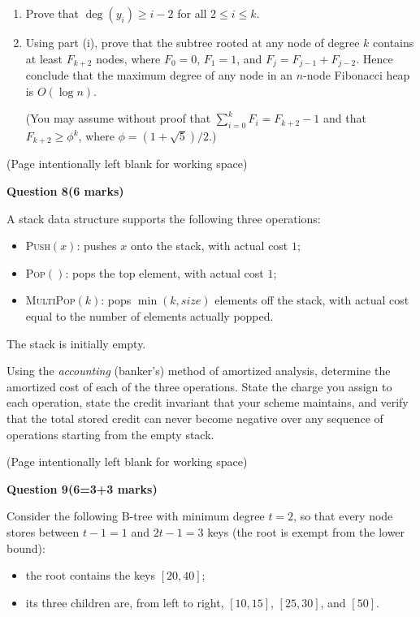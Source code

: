 \documentclass[12pt,letterpaper]{article}
\newcommand{\marksbox}[1]{%
  \vfill
  \begin{flushright}
    \fbox{\parbox[c][1.1cm][c]{1.3cm}{\centering #1}}
  \end{flushright}
}
\newcommand{\questiontitle}[2]{%
  \textbf{Question #1}\hfill\textbf{(#2 marks)}
}
\newcommand{\workingpage}{%
  \newpage
  \begin{center}
    (Page intentionally left blank for working space)
  \end{center}
}
\begin{document}
\begin{enumerate}
  \item[(i)] Prove that $\deg(y_i) \geq i - 2$ for all $2 \leq i \leq k$.

  \item[(ii)] Using part (i), prove that the subtree rooted at any node of
  degree $k$ contains at least $F_{k+2}$ nodes, where $F_0 = 0$, $F_1 = 1$,
  and $F_{j} = F_{j-1} + F_{j-2}$. Hence conclude that the maximum degree of
  any node in an $n$-node Fibonacci heap is $O(\log n)$.

  (You may assume without proof that
  $\sum_{i=0}^{k} F_i = F_{k+2} - 1$ and that $F_{k+2} \geq \phi^{k}$, where
  $\phi = (1 + \sqrt{5})/2$.)
\end{enumerate}

\marksbox{6}

\workingpage
\newpage

\questiontitle{8}{6}

A stack data structure supports the following three operations:

\begin{itemize}
  \item \textsc{Push}$(x)$: pushes $x$ onto the stack, with actual cost $1$;
  \item \textsc{Pop}$()$: pops the top element, with actual cost $1$;
  \item \textsc{MultiPop}$(k)$: pops $\min(k, \mathit{size})$ elements off the
  stack, with actual cost equal to the number of elements actually popped.
\end{itemize}

The stack is initially empty.

Using the \emph{accounting} (banker's) method of amortized analysis, determine
the amortized cost of each of the three operations. State the charge you
assign to each operation, state the credit invariant that your scheme
maintains, and verify that the total stored credit can never become negative
over any sequence of operations starting from the empty stack.

\marksbox{6}

\workingpage
\newpage

\questiontitle{9}{6=3+3}

Consider the following B-tree with minimum degree $t = 2$, so that every node
stores between $t - 1 = 1$ and $2t - 1 = 3$ keys (the root is exempt from the
lower bound):

\begin{itemize}
  \item the root contains the keys $[20, 40]$;
  \item its three children are, from left to right, $[10, 15]$, $[25, 30]$,
  and $[50]$.
\end{itemize}
\end{document}
